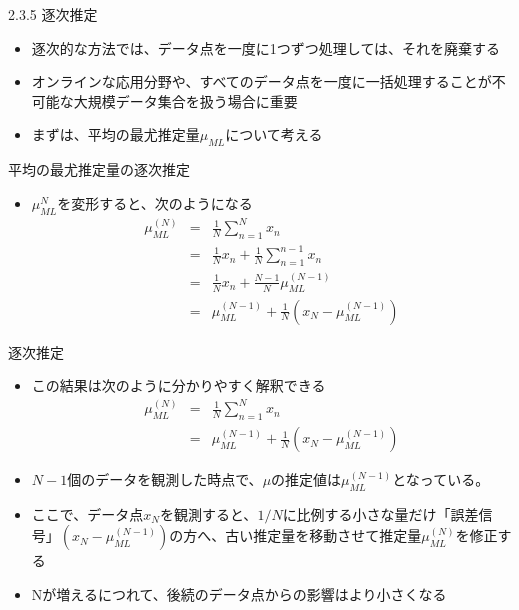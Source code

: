 \begin{frame}{2.3.5 逐次推定}
 \begin{itemize}
  \item 逐次的な方法では、データ点を一度に1つずつ処理しては、それを廃棄する
  \item オンラインな応用分野や、すべてのデータ点を一度に一括処理することが不可能な大規模データ集合を扱う場合に重要
  \item まずは、平均の最尤推定量$\mu_{ML}$について考える
 \end{itemize}
\end{frame}

\begin{frame}{平均の最尤推定量の逐次推定}
 \begin{itemize}
  \item $\mu_{ML}^{N}$を変形すると、次のようになる
        \begin{eqnarray}
         \mu_{ML}^{(N)} &= &\frac{1}{N}\sum_{n=1}^{N}x_n \nonumber \\
         & =& \frac{1}{N}x_n+\frac{1}{N}\sum_{n=1}^{n-1}x_n \nonumber \\
         & =& \frac{1}{N}x_n + \frac{N-1}{N}\mu_{ML}^{(N-1)}\nonumber \\
         & =& \mu_{ML}^{(N-1)} +\frac{1}{N} (x_N-\mu_{ML}^{(N-1)})\label{162008_21Nov14}
        \end{eqnarray}
 \end{itemize}
\end{frame}

\begin{frame}{逐次推定}
 \begin{itemize}
  \item この結果は次のように分かりやすく解釈できる
        \begin{eqnarray}
         \mu_{ML}^{(N)} &= &\frac{1}{N}\sum_{n=1}^{N}x_n \\
         & =& \mu_{ML}^{(N-1)} +\frac{1}{N} (x_N-\mu_{ML}^{(N-1)})
        \end{eqnarray}
  \item $N-1$個のデータを観測した時点で、$\mu$の推定値は$\mu_{ML}^{(N-1)}$となっている。
  \item ここで、データ点$x_N$を観測すると、$1/N$に比例する小さな量だけ「誤差信号」$(x_N-\mu_{ML}^{(N-1)})$の方へ、古い推定量を移動させて推定量$\mu_{ML}^{(N)}$を修正する
  \item Nが増えるにつれて、後続のデータ点からの影響はより小さくなる
 \end{itemize}
\end{frame}

